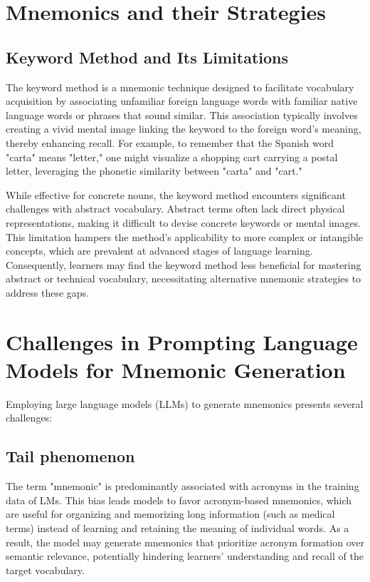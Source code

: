 \documentclass{article}
\begin{document}
\section{Mnemonics and their Strategies} \label{sec:mnemonic-strategies}
\subsection{Keyword Method and Its Limitations} \label{sec:keyword-method}

The keyword method is a mnemonic technique designed to facilitate vocabulary acquisition by associating unfamiliar foreign language words with familiar native language words or phrases that sound similar. This association typically involves creating a vivid mental image linking the keyword to the foreign word's meaning, thereby enhancing recall. For example, to remember that the Spanish word "carta" means "letter," one might visualize a shopping cart carrying a postal letter, leveraging the phonetic similarity between "carta" and "cart."

While effective for concrete nouns, the keyword method encounters significant challenges with abstract vocabulary. Abstract terms often lack direct physical representations, making it difficult to devise concrete keywords or mental images. This limitation hampers the method's applicability to more complex or intangible concepts, which are prevalent at advanced stages of language learning. Consequently, learners may find the keyword method less beneficial for mastering abstract or technical vocabulary, necessitating alternative mnemonic strategies to address these gaps.

\section{Challenges in Prompting Language Models for Mnemonic Generation}

Employing large language models (LLMs) to generate mnemonics presents several challenges:

\subsection{Tail phenomenon}

The term "mnemonic" is predominantly associated with acronyms in the training data of LMs. This bias leads models to favor acronym-based mnemonics, which are useful for organizing and memorizing long information (such as medical terms) instead of learning and retaining the meaning of individual words. As a result, the model may generate mnemonics that prioritize acronym formation over semantic relevance, potentially hindering learners' understanding and recall of the target vocabulary.
\end{document}
